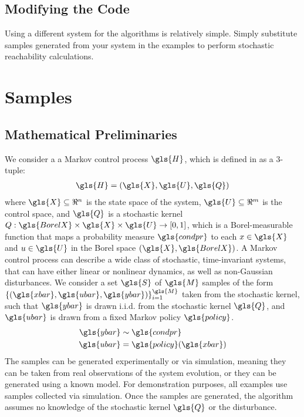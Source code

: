 \documentclass[11pt]{article}
\begin{document}

\subsection{Modifying the Code}

Using a different system for the algorithms is relatively simple. Simply substitute samples generated from your system in the examples to perform stochastic reachability calculations.


\section{Samples}
\label{section: samples}



\subsection{Mathematical Preliminaries}

We consider a a Markov control process $\gls{H}$, which is defined in \cite{summers} as a 3-tuple:
\begin{align}
  \gls{H} = (\gls{X}, \gls{U}, \gls{Q})
\end{align}
where $\gls{X} \subseteq \Re^{n}$ is the state space of the system, $\gls{U} \subseteq \Re^{m}$ is the control space, and $\gls{Q}$ is a stochastic kernel
$Q : \gls{BorelX} \times \gls{X} \times \gls{U} \rightarrow [0, 1]$, which is a Borel-measurable function that maps a probability measure $\gls{condpr}$ to each $x \in \gls{X}$ and $u \in \gls{U}$ in the Borel space $(\gls{X}, \gls{BorelX})$.
A Markov control process can describe a wide class of stochastic, time-invariant systems, that can have either linear or nonlinear dynamics, as well as non-Gaussian disturbances.
%
We consider a set $\gls{S}$ of $\gls{M}$ samples of the form
$\lbrace (\gls{xbar}, \gls{ubar}, \gls{ybar}) \rbrace_{i=1}^{\gls{M}}$ taken from the stochastic kernel,
such that $\gls{ybar}$ is drawn i.i.d. from the stochastic kernel $\gls{Q}$,
and $\gls{ubar}$ is drawn from a fixed Markov policy $\gls{policy}$.
\begin{align}
	\gls{ybar} &\sim \gls{condpr} \\
	\gls{ubar} &= \gls{policy}(\gls{xbar})
\end{align}
The samples can be generated experimentally or via simulation, meaning they can be taken from real observations of the system evolution, or they can be generated using a known model. For demonstration purposes, all examples use samples collected via simulation.
%
Once the samples are generated, the algorithm assumes no knowledge of the stochastic kernel $\gls{Q}$ or the disturbance.
\end{document}
